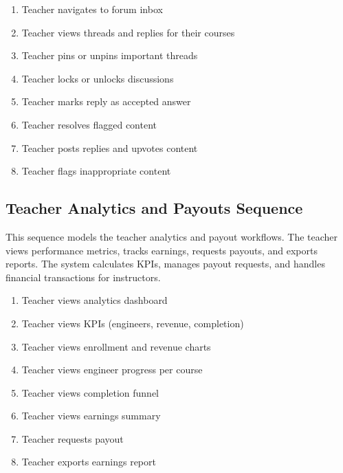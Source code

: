 \begin{enumerate}[topsep=0pt,itemsep=1pt,parsep=0pt,partopsep=0pt]
    \item Teacher navigates to forum inbox
    \item Teacher views threads and replies for their courses
    \item Teacher pins or unpins important threads
    \item Teacher locks or unlocks discussions
    \item Teacher marks reply as accepted answer
    \item Teacher resolves flagged content
    \item Teacher posts replies and upvotes content
    \item Teacher flags inappropriate content
\end{enumerate}


\subsection{Teacher Analytics and Payouts Sequence}
This sequence models the teacher analytics and payout workflows. The teacher
views performance metrics, tracks earnings, requests payouts, and exports
reports. The system calculates KPIs, manages payout requests, and handles
financial transactions for instructors.

\begin{enumerate}[topsep=0pt,itemsep=1pt,parsep=0pt,partopsep=0pt]
    \item Teacher views analytics dashboard
    \item Teacher views KPIs (engineers, revenue, completion)
    \item Teacher views enrollment and revenue charts
    \item Teacher views engineer progress per course
    \item Teacher views completion funnel
    \item Teacher views earnings summary
    \item Teacher requests payout
    \item Teacher exports earnings report
\end{enumerate}

